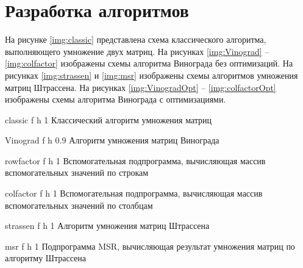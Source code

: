 \section{Разработка алгоритмов}

На рисунке \ref{img:classic} представлена схема классического алгоритма, выполняющего умножение двух матриц. На рисунках \ref{img:Vinograd} -- \ref{img:colfactor} изображены схемы алгоритма Винограда без оптимизаций. На рисунках \ref{img:strassen} и \ref{img:msr} изображены схемы алгоритмов умножения матриц Штрассена.  На рисунках \ref{img:VinogradOpt} -- \ref{img:colfactorOpt} изображены схемы алгоритма Винограда с оптимизациями.

\clearpage

{classic} %
{f} %
{h} %
{1\textwidth} %
{Классический алгоритм умножения матриц} %


{Vinograd} %
{f} %
{h} %
{0.9\textwidth} %
{Алгоритм умножения матриц Винограда} %

{rowfactor} %
{f} %
{h} %
{1\textwidth} %
{Вспомогательная подпрограмма, вычисляющая массив вспомогательных значений по строкам} %

{colfactor} %
{f} %
{h} %
{1\textwidth} %
{Вспомогательная подпрограмма, вычисляющая массив вспомогательных значений по столбцам} %

{strassen} %
{f} %
{h} %
{1\textwidth} %
{Алгоритм умножения матриц Штрассена} %

{msr} %
{f} %
{h} %
{1\textwidth} %
{Подпрограмма MSR, вычисляющая результат умножения матриц по алгоритму Штрассена} %

